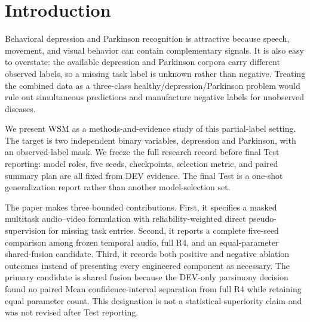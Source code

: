 \section{Introduction}

Behavioral depression and Parkinson recognition is attractive because speech, movement, and visual behavior can contain complementary signals. It is also easy to overstate: the available depression and Parkinson corpora carry different observed labels, so a missing task label is unknown rather than negative. Treating the combined data as a three-class healthy/depression/Parkinson problem would rule out simultaneous predictions and manufacture negative labels for unobserved diseases.

We present WSM as a methods-and-evidence study of this partial-label setting. The target is two independent binary variables, depression and Parkinson, with an observed-label mask. We freeze the full research record before final Test reporting: model roles, five seeds, checkpoints, selection metric, and paired summary plan are all fixed from DEV evidence. The final Test is a one-shot generalization report rather than another model-selection set.

The paper makes three bounded contributions. First, it specifies a masked multitask audio--video formulation with reliability-weighted direct pseudo-supervision for missing task entries. Second, it reports a complete five-seed comparison among frozen temporal audio, full R4, and an equal-parameter shared-fusion candidate. Third, it records both positive and negative ablation outcomes instead of presenting every engineered component as necessary. The primary candidate is shared fusion because the DEV-only parsimony decision found no paired Mean confidence-interval separation from full R4 while retaining equal parameter count. This designation is not a statistical-superiority claim and was not revised after Test reporting.
